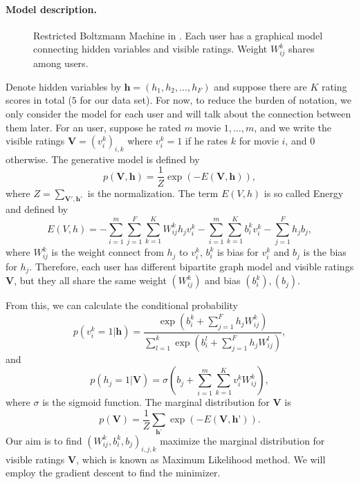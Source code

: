 \documentclass[bj, preprint]{imsart}
\begin{document}
\paragraph{Model description.}\label{par:method.models.rbm.model}

\begin{figure}
	
	\caption{Restricted Boltzmann Machine in . Each user has a graphical model connecting hidden variables and visible ratings. Weight $W_{ij}^{k}$ shares among users.\label{fig:method.models.rbm}}
\end{figure}



Denote hidden variables by $\textbf{h} = (h_1, h_2,\dots, h_F)$ and suppose there are $K$ rating scores in total ($5$ for our data set). For now, to reduce the burden of notation, we only consider the model for each user and will talk about the connection between them later. For an user, suppose he rated $m$ movie $1, \dots, m$, and we write the visible ratings $\textbf{V} = (v_i^k)_{i,k}$ where $v_i^k = 1$ if he rates $k$ for movie $i$, and $0$ otherwise. The generative model is defined by
\begin{equation}\label{GenModelRBM}
p(\textbf{V}, \textbf{h}) = \dfrac{1}{Z} \exp(-E(\textbf{V}, \textbf{h})),
\end{equation}
where $Z = \sum_{\textbf{V}', \textbf{h}'}$ is the normalization. The term $E(V, h)$ is so called Energy and defined by
\begin{equation}\label{EnergyRBM}
E(V,h) = - \sum_{i=1}^{m} \sum_{j=1}^{F} \sum_{k=1}^{K} W_{ij}^k h_j v_i^k - \sum_{i=1}^{m} \sum_{k=1}^{K} b_i^k v_i^k - \sum_{j=1}^{F} h_j b_j,
\end{equation}
where $W_{ij}^k$ is the weight connect from $h_j$ to $v_i^k$, $b_i^k$ is bias for $v_i^k$ and $b_j$ is the bias for $h_j$. Therefore, each user has different bipartite graph model and visible ratings $\textbf{V}$, but they all share the same weight $(W_{ij}^k)$ and bias $(b_i^k), (b_j)$.   

From this, we can calculate the conditional probability 
\begin{equation}\label{pv|h}
p(v_i^k = 1| \textbf{h}) = \dfrac{\exp(b_{i}^{k} + \sum_{j=1}^{F} h_j W_{ij}^k)}{\sum_{l=1}^{k} \exp(b_{i}^{l} + \sum_{j=1}^{F} h_j W_{ij}^l)}, 
\end{equation}
and
\begin{equation}\label{ph|v}
p(h_j = 1 | \textbf{V}) = \sigma(b_j + \sum_{i=1}^{m}\sum_{k=1}^{K} v_i^k W_{ij}^{k}),
\end{equation}
where $\sigma$ is the sigmoid function. The marginal distribution for $\textbf{V}$ is
$$p(\textbf{V}) = \dfrac{1}{Z} \sum_{\textbf{h'}} \exp(-E(\textbf{V}, \textbf{h'})).$$
Our aim is to find $(W_{ij}^{k}, b_{i}^{k}, b_j)_{i,j,k}$ maximize the marginal distribution for visible ratings $\textbf{V}$, which is known as Maximum Likelihood method. We will employ the gradient descent to find the minimizer. 
\end{document}
